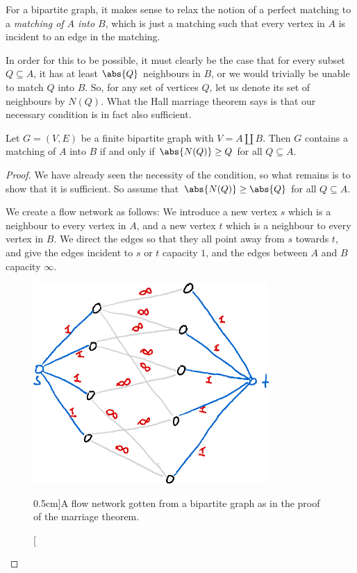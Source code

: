 \documentclass[nobib]{tufte-handout}
\begin{document}
For a bipartite graph, it makes sense to relax the notion of a perfect matching to a \emph{matching of $A$ into $B$}, which is just a matching such that every vertex in $A$ is incident to an edge in the matching.

In order for this to be possible, it must clearly be the case that for every subset $Q \subseteq A$, it has at least $\abs{Q}$ neighbours in $B$, or we would trivially be unable to match $Q$ into $B$. So, for any set of vertices $Q$, let us denote its set of neighbours by $N(Q)$. What the Hall marriage theorem says is that our necessary condition is in fact also sufficient.

\begin{theorem}
    Let $G = (V,E)$ be a finite bipartite graph with $V = A \coprod B$. Then $G$ contains a matching of $A$ into $B$ if and only if $\abs{N(Q)} \geq Q$ for all $Q \subseteq A$.

    \begin{proof}
        We have already seen the necessity of the condition, so what remains is to show that it is sufficient. So assume that $\abs{N(Q)} \geq \abs{Q}$ for all $Q \subseteq A$.

        We create a flow network as follows: We introduce a new vertex $s$ which is a neighbour to every vertex in $A$, and a new vertex $t$ which is a neighbour to every vertex in $B$. We direct the edges so that they all point away from $s$ towards $t$, and give the edges incident to $s$ or $t$ capacity $1$, and the edges between $A$ and $B$ capacity $\infty$.

        \begin{figure}
            \centering
            \includegraphics[width=0.8\textwidth]{graphics/L7_flows/flow_from_bipartite.png}
            \caption[][0.5cm]{A flow network gotten from a bipartite graph as in the proof of the marriage theorem.}
            \label{fig:flow_from_bipartite}
        \end{figure}


\end{proof}
\end{theorem}
\end{document}
